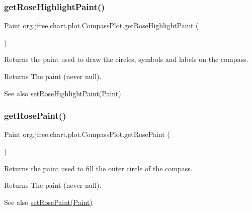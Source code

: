 \subsubsection{\texorpdfstring{get\+Rose\+Highlight\+Paint()}{getRoseHighlightPaint()}}
{\footnotesize\ttfamily Paint org.\+jfree.\+chart.\+plot.\+Compass\+Plot.\+get\+Rose\+Highlight\+Paint (\begin{DoxyParamCaption}{ }\end{DoxyParamCaption})}

Returns the paint used to draw the circles, symbols and labels on the compass.

\begin{DoxyReturn}{Returns}
The paint (never {\ttfamily null}).
\end{DoxyReturn}
\begin{DoxySeeAlso}{See also}
\mbox{\hyperlink{classorg_1_1jfree_1_1chart_1_1plot_1_1_compass_plot_a4b63fbf468b95ed64c3e139bf74a365b}{set\+Rose\+Highlight\+Paint(\+Paint)}} 
\end{DoxySeeAlso}
\mbox{\label{classorg_1_1jfree_1_1chart_1_1plot_1_1_compass_plot_ad70a4293a0a4a9998726fbcb110c581d}} 
\subsubsection{\texorpdfstring{get\+Rose\+Paint()}{getRosePaint()}}
{\footnotesize\ttfamily Paint org.\+jfree.\+chart.\+plot.\+Compass\+Plot.\+get\+Rose\+Paint (\begin{DoxyParamCaption}{ }\end{DoxyParamCaption})}

Returns the paint used to fill the outer circle of the compass.

\begin{DoxyReturn}{Returns}
The paint (never {\ttfamily null}).
\end{DoxyReturn}
\begin{DoxySeeAlso}{See also}
\mbox{\hyperlink{classorg_1_1jfree_1_1chart_1_1plot_1_1_compass_plot_acf31acd8f0bb61bbab25e161c2e98768}{set\+Rose\+Paint(\+Paint)}} 
\end{DoxySeeAlso}
\mbox{\label{classorg_1_1jfree_1_1chart_1_1plot_1_1_compass_plot_a51c6d6fab150718d76e187dbcee91c78}} 
